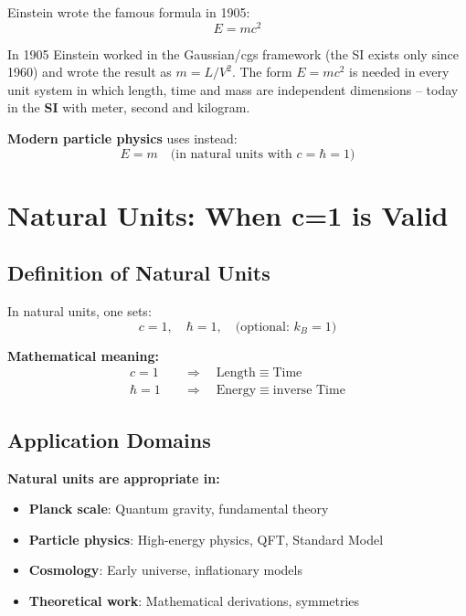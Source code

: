 	Einstein wrote the famous formula in 1905:
	\begin{equation}
		E = mc^2
	\end{equation}
	
	In 1905 Einstein worked in the Gaussian/cgs framework (the SI exists only since 1960) and wrote the result as $m = L/V^2$. The form $E = mc^2$ is needed in every unit system in which length, time and mass are independent dimensions -- today in the \textbf{SI} with meter, second and kilogram.
	
	\textbf{Modern particle physics} uses instead:
	\begin{equation}
		E = m \quad \text{(in natural units with } c=\hbar=1\text{)}
	\end{equation}
	
	\section{Natural Units: When c=1 is Valid}
	
	\subsection{Definition of Natural Units}
	
	In natural units, one sets:
	\begin{equation}
		c = 1, \quad \hbar = 1, \quad \text{(optional: } k_B = 1 \text{)}
	\end{equation}
	
	\textbf{Mathematical meaning:}
	\begin{align}
		c = 1 \quad &\Rightarrow \quad \text{Length} \equiv \text{Time} \\
		\hbar = 1 \quad &\Rightarrow \quad \text{Energy} \equiv \text{inverse Time}
	\end{align}
	
	\subsection{Application Domains}
	
	\textbf{Natural units are appropriate in:}
	
	\begin{itemize}
		\item \textbf{Planck scale}: Quantum gravity, fundamental theory
		\item \textbf{Particle physics}: High-energy physics, QFT, Standard Model
		\item \textbf{Cosmology}: Early universe, inflationary models
		\item \textbf{Theoretical work}: Mathematical derivations, symmetries
	\end{itemize}
	
